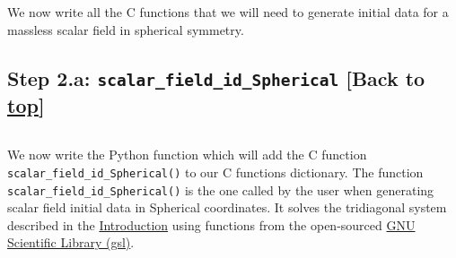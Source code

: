\documentclass[landscape,letterpaper,10pt,english]{article}
\begin{document}
\[\label{adding_functions_to_dictionary}\]

We now write all the C functions that we will need to generate initial
data for a massless scalar field in spherical symmetry.

    \hypertarget{step-2.a-scalar_field_id_spherical-back-to-top}{%
\subsection{\texorpdfstring{Step 2.a:
\texttt{scalar\_field\_id\_Spherical} {[}Back to
\hyperref[toc]{top}{]}}{Step 2.a: scalar\_field\_id\_Spherical {[}Back to {]}}}\label{step-2.a-scalar_field_id_spherical-back-to-top}}

\[\label{scalar_field_id_spherical}\]

We now write the Python function which will add the C function
\texttt{scalar\_field\_id\_Spherical()} to our C functions dictionary.
The function \texttt{scalar\_field\_id\_Spherical()} is the one called
by the user when generating scalar field initial data in Spherical
coordinates. It solves the tridiagonal system described in the
\hyperref[introduction]{Introduction} using functions from the
open-sourced \href{https://www.gnu.org/software/gsl/}{GNU Scientific
Library (gsl)}.
\end{document}
